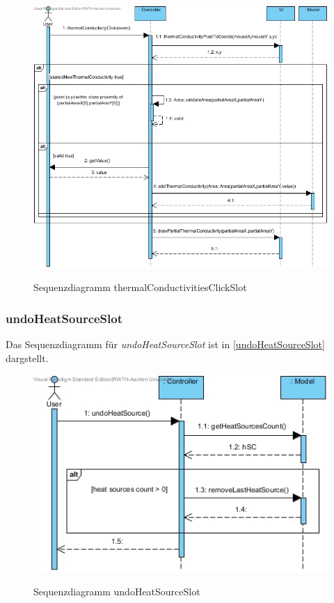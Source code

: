 \begin{figure}[H]
	\centering
	\includegraphics[scale=.6]{Bilder/Controller__thermalConductivitiesClickSlot().jpg}\\
	\caption{Sequenzdiagramm thermalConductivitiesClickSlot}
	\label{Sequenzdiagramm thermalConductivitiesClickSlot}
\end{figure}

\subsubsection*{undoHeatSourceSlot}

Das Sequenzdiagramm für \emph{undoHeatSourceSlot} ist in \ref{undoHeatSourceSlot} dargstellt.

\begin{figure}[H]
	\centering
	\includegraphics[scale=.6]{Bilder/Controller__undoHeatSourceSlot().jpg}\\
	\caption{Sequenzdiagramm undoHeatSourceSlot}
	\label{Sequenzdiagramm undoHeatSourceSlot}
\end{figure}

